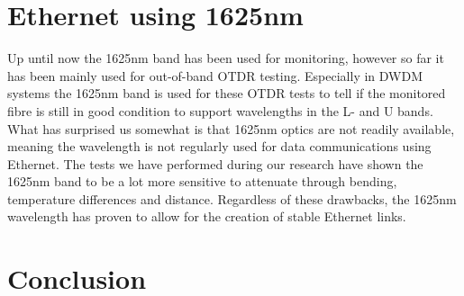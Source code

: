 \documentclass{article}
\begin{document}
\section{Ethernet using 1625nm}
Up until now the 1625nm band has been used for monitoring, however so far it has been mainly used for out-of-band OTDR testing.
Especially in DWDM systems the 1625nm band is used for these OTDR tests to tell if the monitored fibre is still in good condition to support wavelengths in the L- and U bands.
What has surprised us somewhat is that 1625nm optics are not readily available, meaning the wavelength is not regularly used for data communications using Ethernet.
The tests we have performed during our research have shown the 1625nm band to be a lot more sensitive to attenuate through bending, temperature differences and distance.
Regardless of these drawbacks, the 1625nm wavelength has proven to allow for the creation of stable Ethernet links.




\newpage
\section{Conclusion}


\end{document}

